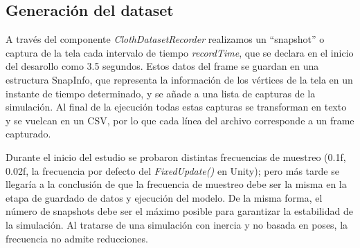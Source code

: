 \subsection{Generación del dataset}
A través del componente \textit{ClothDatasetRecorder} realizamos un ``snapshot'' o captura de la tela cada intervalo de tiempo \textit{recordTime}, que se declara en el inicio del desarollo como 3.5 segundos. Estos datos del frame se guardan en una estructura SnapInfo, que representa la información de los vértices de la tela en un instante de tiempo determinado, y se añade a una lista de capturas de la simulación. 
Al final de la ejecución todas estas capturas se transforman en texto y se vuelcan en un CSV, por lo que cada línea del archivo corresponde a un frame capturado. \newline


\begin{algorithm}[H]
\caption{Struct SnapInfo: representación de un frame}

\end{algorithm}

Durante el inicio del estudio se probaron distintas frecuencias de muestreo (0.1f, 0.02f, la frecuencia por defecto del \textit{FixedUpdate()} en Unity); pero más tarde se llegaría a la conclusión de que la frecuencia de muestreo debe ser la misma en la etapa de guardado de datos y ejecución del modelo. De la misma forma, el número de snapshots debe ser el máximo posible para garantizar la estabilidad de la simulación. Al tratarse de una simulación con inercia y no basada en poses, la frecuencia no admite reducciones.